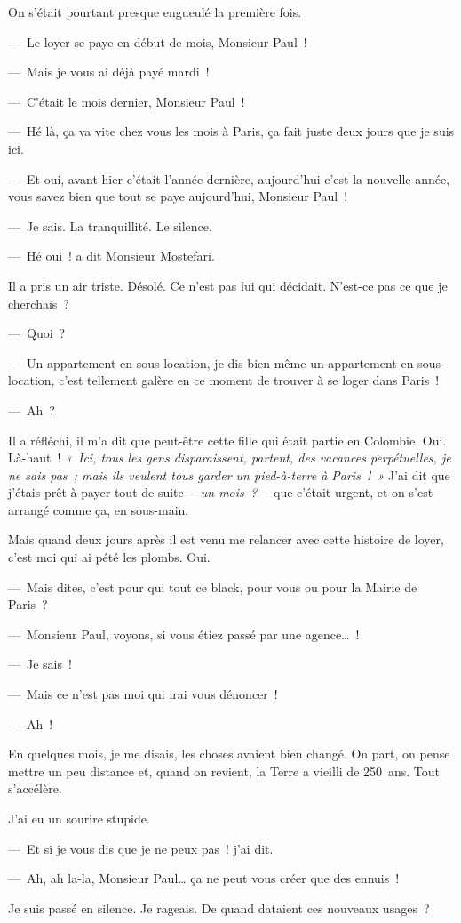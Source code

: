\documentclass[french,twoside]{book} %
\begin{document}
On s’était pourtant presque engueulé la première fois.\par
— Le loyer se paye en début de mois, Monsieur Paul !\par
— Mais je vous ai déjà payé mardi !\par
— C’était le mois dernier, Monsieur Paul !\par
— Hé là, ça va vite chez vous les mois à Paris, ça fait juste deux jours que je suis ici.\par
— Et oui, avant-hier c’était l’année dernière, aujourd’hui c’est la nouvelle année, vous savez bien que tout se paye aujourd’hui, Monsieur Paul !\par
— Je sais. La tranquillité. Le silence.\par
— Hé oui ! a dit Monsieur Mostefari.\par
Il a pris un air triste. Désolé. Ce n’est pas lui qui décidait. N’est-ce pas ce que je cherchais ?\par
— Quoi ?\par
— Un appartement en sous-location, je dis bien même un appartement en sous-location, c’est tellement galère en ce moment de trouver à se loger dans Paris !\par
— Ah ?\par
Il a réfléchi, il m’a dit que peut-être cette fille qui était partie en Colombie. Oui. Là-haut ! \emph{« Ici, tous les gens disparaissent, partent, des vacances perpétuelles, je ne sais pas ; mais ils veulent tous garder un pied-à-terre à Paris ! »} J’ai dit que j’étais prêt à payer tout de suite \emph{– un mois ? –} que c’était urgent, et on s’est arrangé comme ça, en sous-main.\par
Mais quand deux jours après il est venu me relancer avec cette histoire de loyer, c’est moi qui ai pété les plombs. Oui.\par
— Mais dites, c’est pour qui tout ce black, pour vous ou pour la Mairie de Paris ?\par
— Monsieur Paul, voyons, si vous étiez passé par une agence… !\par
— Je sais !\par
— Mais ce n’est pas moi qui irai vous dénoncer !\par
— Ah !\par
En quelques mois, je me disais, les choses avaient bien changé. On part, on pense mettre un peu distance et, quand on revient, la Terre a vieilli de 250 ans. Tout s’accélère.\par
J’ai eu un sourire stupide.\par
— Et si je vous dis que je ne peux pas ! j’ai dit.\par
— Ah, ah la-la, Monsieur Paul… ça ne peut vous créer que des ennuis !\par
Je suis passé en silence. Je rageais. De quand dataient ces nouveaux usages ?
\end{document}

